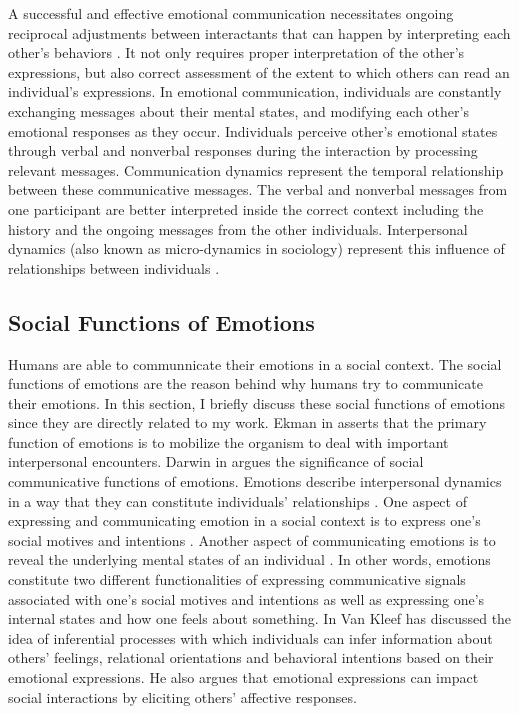 \documentclass[12pt]{report}
\begin{document}
A successful and effective emotional communication necessitates ongoing
reciprocal adjustments between interactants that can happen by interpreting each
other's behaviors \cite{parkinson:emotion-social-interaction}. It not only
requires proper interpretation of the other's expressions, but also correct
assessment of the extent to which others can read an individual's expressions.
In emotional communication, individuals are constantly exchanging messages about
their mental states, and modifying each other's emotional responses as they
occur. Individuals perceive other's emotional states through verbal and
nonverbal responses during the interaction by processing relevant messages.
Communication dynamics represent the temporal relationship between these
communicative messages. The verbal and nonverbal messages from one participant
are better interpreted inside the correct context including the history and the
ongoing messages from the other individuals. Interpersonal dynamics (also known
as micro-dynamics in sociology) represent this influence of relationships
between individuals \cite{louis:communication-dynamic}.

\subsection{Social Functions of Emotions}
\label{section-emotion-social-functions}

Humans are able to communnicate their emotions in a social context. The social
functions of emotions are the reason behind why humans try to communicate their
emotions. In this section, I briefly discuss these social functions of emotions
since they are directly related to my work. Ekman in
\cite{ekman:argument-emotions} asserts that the primary function of emotions is
to mobilize the organism to deal with important interpersonal encounters. Darwin
in \cite{darwin:emotion-expression} argues the significance of social
communicative functions of emotions. Emotions describe interpersonal dynamics in
a way that they can constitute individuals' relationships
\cite{parkinson:emotions-social, tiedens:social-life}. One aspect of expressing
and communicating emotion in a social context is to express one's social motives
and intentions \cite{hess:darwin-emotion}. Another aspect of communicating
emotions is to reveal the underlying mental states of an individual
\cite{parkinson:emotion-communication}. In other words, emotions constitute two
different functionalities of expressing communicative signals associated with
one's social motives and intentions as well as expressing one's internal states
and how one feels about something. In \cite{kleef:emotion-regulate-social} Van
Kleef has discussed the idea of inferential processes with which individuals can
infer information about others' feelings, relational orientations and behavioral
intentions based on their emotional expressions. He also argues that emotional
expressions can impact social interactions by eliciting others' affective
responses.
\end{document}
